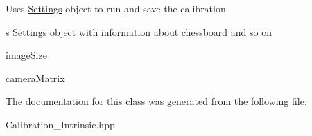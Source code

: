 Uses \mbox{\hyperlink{class_settings}{Settings}} object to run and save the calibration \begin{DoxyItemize}
\item s \mbox{\hyperlink{class_settings}{Settings}} object with information about chessboard and so on \item image\+Size \item camera\+Matrix \end{DoxyItemize}


The documentation for this class was generated from the following file\+:\begin{DoxyCompactItemize}
\item 
Calibration\+\_\+\+Intrinsic.\+hpp\end{DoxyCompactItemize}
